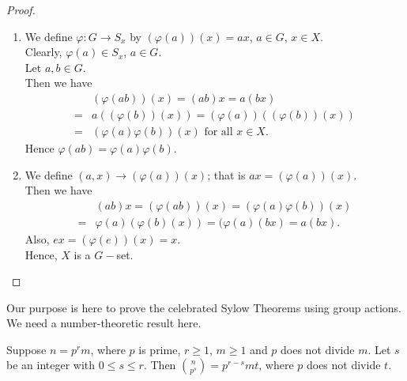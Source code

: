 \documentclass[../main-sheet.tex]{subfiles}
\begin{document}
\begin{proof}
    \begin{enumerate}[label=(\roman*)]
        \item We define \(\varphi : G\to S_x\) by \((\varphi(a))(x) = ax\), \(a \in G \), \(x \in X \).\\
        Clearly, \(\varphi(a) \in S_x\), \(a \in G\).\\
        Let \(a, b \in G\).\\
        Then we have
        \begin{align*}
            &( \varphi(ab))(x) = (ab )x = a (bx)\\
            =& a ((\varphi(b))(x)) = (\varphi(a)) (( \varphi(b))(x))\\
            =& (\varphi(a) \varphi(b))(x) \text{ for all } x \in X.
        \end{align*}
        Hence \(\varphi(ab) = \varphi(a ) \varphi( b )\).
        \item We define \((a, x) \to (\varphi(a))(x)\); that is \(ax = (\varphi(a))(x)\).\\
        Then we have
        \begin{align*}
            &( ab )x = (\varphi(ab))(x) = ( \varphi(a) \varphi(b))(x)\\
            =& \varphi ( a )( \varphi( b )(x) ) = (\varphi( a)(bx ) = a( bx ).
        \end{align*}
        Also, \(ex = ( \varphi(e))(x) = x\).\\
        Hence, \(X\) is a \(G -\)set.
    \end{enumerate}
\end{proof}
Our purpose is here to prove the celebrated Sylow Theorems using group actions.\\
We need a number-theoretic result here.\\
\begin{thm}
    Suppose \(n = p^rm\), where \(p\) is prime, \(r \geq 1\), \(m \geq 1\) and \(p\) does not divide \(m\). Let \(s\) be an integer with \(0 \leq s \leq r\). Then \(\binom{n}{p^s} = p^{r-s}mt\), where \(p\) does not divide \(t\).
\end{thm}
\end{document}
